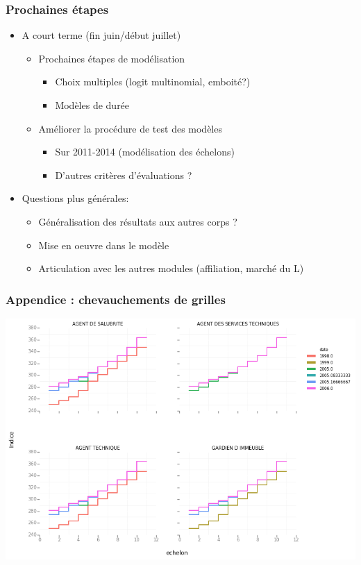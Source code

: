 \documentclass[xcolor=table,ignorenonframetext,12pt]{beamer}
\newenvironment{choixmarges}[2]{\begin{list}{}{%
\setlength{\topsep}{0pt}%
\setlength{\leftmargin}{0pt}%
\setlength{\rightmargin}{0pt}%
\setlength{\listparindent}{\parindent}%
\setlength{\itemindent}{\parindent}%
\setlength{\parsep}{0pt plus 1pt}%
\addtolength{\leftmargin}{#1}%
\addtolength{\rightmargin}{#2}%
}\item }{\end{list}}
\begin{document}
\begin{frame}

\frametitle{Prochaines étapes}

\begin{choixmarges}{-0.5cm}{-0.5cm}

\begin{itemize}

\item A court terme (fin juin/début juillet)

\begin{itemize}

\item Prochaines étapes de modélisation
\begin{itemize}
\item Choix multiples (logit multinomial, emboité?)
\item Modèles de durée
\end{itemize}

\vspace{0.1cm}

\item Améliorer la procédure de test des modèles
\begin{itemize}
\item Sur 2011-2014 (modélisation des échelons)
\item D'autres critères d'évaluations ? 
\end{itemize}

\end{itemize}

\vspace{0.2cm}


\item Questions plus générales:
\begin{itemize}
\item Généralisation des résultats aux autres corps ?
\item Mise en oeuvre dans le modèle
\item Articulation avec les autres modules (affiliation, marché du L)
\end{itemize}

\end{itemize}



\end{choixmarges}
\end{frame}


\begin{frame}[label = chevauchements]

\frametitle{Appendice : chevauchements de grilles}
\includegraphics[width=\textwidth]{Graphiques/chevauchements.png}

\end{frame}
\end{document}
